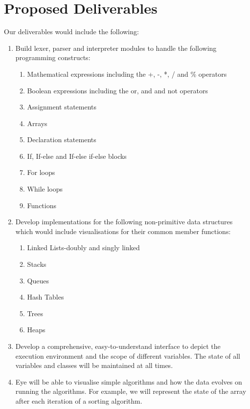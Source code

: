 \documentclass{article}
\begin{document}
\section{Proposed Deliverables}
Our deliverables would include the following:
\begin{enumerate}
    \item Build lexer, parser and interpreter modules to handle the following programming constructs:
    \begin{enumerate}
        \item Mathematical expressions including the +, -, *, / and \% operators
        \item Boolean expressions including the or, and and not operators
        \item Assignment statements
        \item Arrays
        \item Declaration statements
        \item If, If-else and If-else if-else blocks
        \item For loops
        \item While loops
        \item Functions
    \end{enumerate}
    \item Develop implementations for the following non-primitive data structures which would include visualisations for their common member functions:
    \begin{enumerate}
        \item Linked Lists-doubly and singly linked
        \item Stacks
        \item Queues
        \item Hash Tables
        \item Trees
        \item Heaps
    \end{enumerate}
    \item Develop a comprehensive, easy-to-understand interface to depict the execution environment and the scope of different variables. The state of all variables and classes will be maintained at all times.
    \item Eye will be able to visualise simple algorithms and how the data evolves on running the algorithms. For example, we will represent the state of the array after each iteration of a sorting algorithm.
\end{enumerate}
\end{document}
